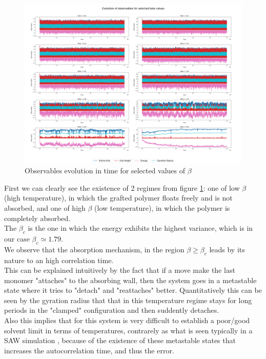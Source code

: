 \begin{figure}[H]
    \centering
    \includegraphics[width=\textwidth]{FIG/exercise_6_images/observables_polymer_summary.png}
    \caption{Observables evolution in time for selected values of $\beta$}
    \label{lec6:polymer_evolution_pre_mmc}
\end{figure}

First we can clearly see the existence of 2 regimes from figure \ref{lec6:polymer_evolution_pre_mmc}: one of low $\beta$ (high temperature), in which
the grafted polymer floats freely and is not absorbed, and one of high $\beta$ (low temperature), in which the polymer is completely absorbed. \\
The $\beta_c$ is the one in which the energy exhibits the highest variance, which is in our case $\beta_c \simeq 1.79$.\\ We observe that the absorption mechanism, in the region $\beta \geq \beta_c$ leads by its nature to an high correlation time. \\
This can be explained intuitively by the fact that if a move make the last monomer "attaches" to the absorbing wall, then the system goes in a metastable state where it tries to 
"detach" and "reattaches" better. Quantitatively this can be seen by the gyration radius that that in this temperature regime stays for long periods in the "clamped" configuration
and then suddently detaches. \\
Also this implies that for this system is very difficult to establish a poor/good solvent limit in terms of temperatures, contrarely as what is seen typically in a SAW simulation \cite{OrlandoBrando}, because of the existence 
of these metastable states that increases the autocorrelation time, and thus the error.


